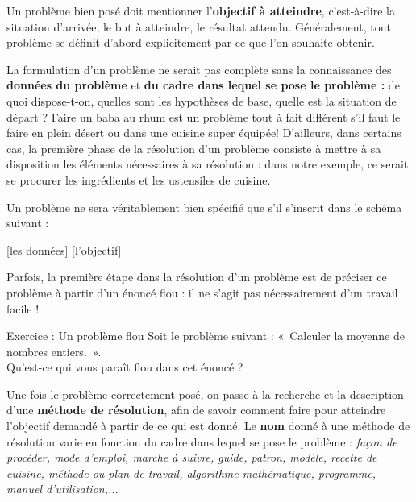 		Un problème bien posé doit mentionner l’\textbf{objectif à atteindre},
		c’est-à-dire la situation d’arrivée, le but à atteindre, le résultat
		attendu. Généralement, tout problème se définit d’abord explicitement
		par ce que l’on souhaite obtenir.
		
		La formulation d’un problème ne serait pas complète sans la connaissance
		des \textbf{données du problème} et \textbf{du cadre dans lequel se
		pose le problème :} de quoi dispose-t-on, quelles sont les hypothèses
		de base, quelle est la situation de départ ? Faire un baba au rhum est
		un problème tout à fait différent s’il faut le faire en plein désert ou
		dans une cuisine super équipée! D’ailleurs, dans certains cas, la
		première phase de la résolution d’un problème consiste à mettre à sa
		disposition les éléments nécessaires à sa résolution : dans notre
		exemple, ce serait se procurer les ingrédients et les ustensiles de
		cuisine.
	
		Un problème ne sera véritablement bien spécifié que s’il s’inscrit dans
		le schéma suivant :
		
		\begin{center}
		\begin{Ovalbox}
		{ [les données]  [l’objectif]}
		\end{Ovalbox}
		\end{center}
	
		Parfois, la première étape dans la résolution d’un problème est de
		préciser ce problème à partir d’un énoncé flou : il ne s’agit pas
		nécessairement d’un travail facile !

		\begin{Emphase}{Exercice : Un problème flou}
			Soit le problème suivant : «~Calculer la moyenne de nombres entiers.~».
			\\Qu'est-ce qui vous paraît flou dans cet énoncé ?
		\end{Emphase}

		Une fois le problème correctement posé, on passe à la recherche et la
		description d’une \textbf{méthode de résolution}, afin de savoir
		comment faire pour atteindre l’objectif demandé à partir de ce qui est
		donné. Le \textbf{nom} donné à une méthode de résolution varie en
		fonction du cadre dans lequel se pose le problème : \textit{façon de
		procéder, mode d’emploi, marche à suivre, guide, patron, modèle,
		recette de cuisine, méthode ou plan de travail, algorithme
		mathématique, programme, manuel d’utilisation,...}

